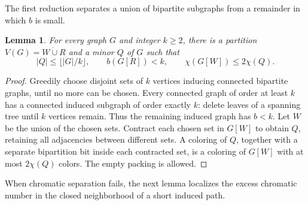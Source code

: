 \documentclass[11pt]{article}
\newtheorem{lemma}[theorem]{Lemma}
\begin{document}
The first reduction separates a union of bipartite subgraphs from a
remainder in which $b$ is small.
\begin{lemma}\label{lem:packing}
For every graph $G$ and integer $k\ge2$, there is a partition
$V(G)=W\mathbin{\dot\cup}R$ and a minor $Q$ of $G$ such that
\[
 |Q|\le\lfloor |G|/k\rfloor,\qquad b(G[R])<k,
 \qquad \chi(G[W])\le2\chi(Q).
\]
\end{lemma}
\begin{proof}
Greedily choose disjoint sets of $k$ vertices inducing connected
bipartite graphs, until no more can be chosen. Every connected graph
of order at least $k$ has a connected induced subgraph of order exactly
$k$: delete leaves of a spanning tree until $k$ vertices remain.
Thus the remaining induced graph has $b<k$.
Let $W$ be the union of the chosen sets. Contract each chosen set in
$G[W]$ to obtain $Q$, retaining all adjacencies between different sets.
A coloring of $Q$, together with a separate bipartition bit inside
each contracted set, is a coloring of $G[W]$ with at most $2\chi(Q)$
colors. The empty packing is allowed.
\end{proof}

When chromatic separation fails, the next lemma localizes the excess
chromatic number in the closed neighborhood of a short induced path.
\end{document}
